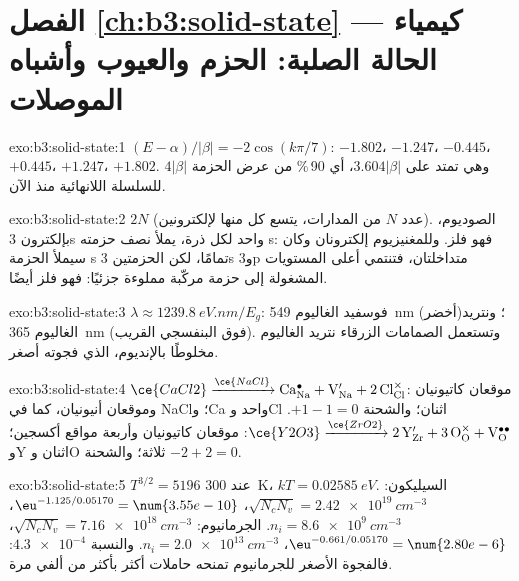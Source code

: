 \section*{الفصل \ref{ch:b3:solid-state} --- كيمياء الحالة الصلبة: الحزم والعيوب وأشباه الموصلات}

\begin{solution}{exo:b3:solid-state:1}
$(E - \alpha)/|\beta| = -2\cos(k\pi/7)$: $-1.802$، $-1.247$، $-0.445$، $+0.445$، $+1.247$، $+1.802$. وهي تمتد على
$3.604|\beta|$، أي 90\,\% من عرض الحزمة $4|\beta|$ للسلسلة اللانهائية منذ الآن.
\end{solution}

\begin{solution}{exo:b3:solid-state:2}
$2N$ (عدد $N$ من المدارات، يتسع كل منها لإلكترونين). الصوديوم، بإلكترون 3s واحد لكل ذرة، يملأ
نصف حزمته s: فهو فلز. وللمغنيزيوم إلكترونان وكان سيملأ الحزمة s تمامًا،
لكن الحزمتين 3s و3p متداخلتان، فتنتمي أعلى المستويات المشغولة إلى
حزمة مركّبة مملوءة جزئيًا: فهو فلز أيضًا.
\end{solution}

\begin{solution}{exo:b3:solid-state:3}
$\lambda \approx \qty{1239.8}{eV.nm}/E_g$: فوسفيد الغاليوم \qty{549}{nm} (أخضر)؛ ونتريد الغاليوم \qty{365}{nm}
(فوق البنفسجي القريب). وتستعمل الصمامات الزرقاء نتريد الغاليوم مخلوطًا بالإنديوم، الذي
فجوته أصغر.
\end{solution}

\begin{solution}{exo:b3:solid-state:4}
$\ce{CaCl2} \xrightarrow{\ce{NaCl}} \mathrm{Ca_{Na}^{\bullet} + V_{Na}' + 2\,Cl_{Cl}^{\times}}$: موقعان كاتيونيان وموقعان أنيونيان، كما في NaCl؛ وCa واحد 
وCl اثنان؛ والشحنة $+1 - 1 = 0$. $\ce{Y2O3} \xrightarrow{\ce{ZrO2}} \mathrm{2\,Y_{Zr}' + 3\,O_O^{\times} + V_O^{\bullet\bullet}}$: موقعان كاتيونيان وأربعة مواقع أكسجين؛ وY اثنان
وO ثلاثة؛ والشحنة $-2 + 2 = 0$.
\end{solution}

\begin{solution}{exo:b3:solid-state:5}
$T^{3/2} = 5196$ عند \qty{300}{K}، $kT = \qty{0.02585}{eV}$. السيليكون: $\sqrt{N_cN_v} = \qty{2.42e19}{cm^{-3}}$، $\eu^{-1.125/0.05170} = \num{3.55e-10}$،
$n_i = \qty{8.6e9}{cm^{-3}}$. الجرمانيوم: $\sqrt{N_cN_v} = \qty{7.16e18}{cm^{-3}}$، $\eu^{-0.661/0.05170} = \num{2.80e-6}$، $n_i = \qty{2.0e13}{cm^{-3}}$. والنسبة
$\num{4.3e-4}$: فالفجوة الأصغر للجرمانيوم تمنحه حاملات أكثر بأكثر من ألفي
مرة.
\end{solution}

